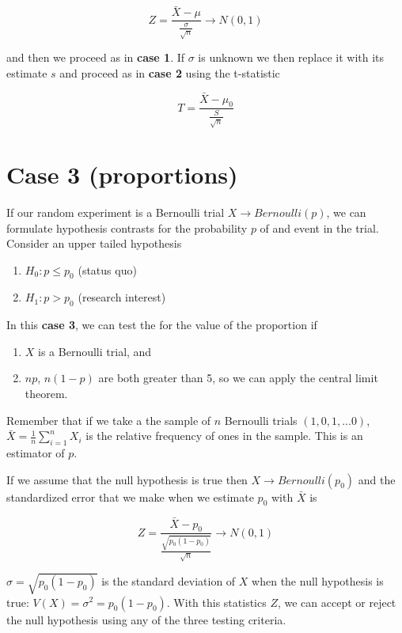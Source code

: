 \documentclass[
]{book}
\providecommand{\tightlist}{%
  \setlength{\itemsep}{0pt}\setlength{\parskip}{0pt}}
\begin{document}
\[Z=\frac{\bar{X}-\mu}{\frac{\sigma}{\sqrt{n}}}  \rightarrow N(0,1)\]

and then we proceed as in \textbf{case 1}. If \(\sigma\) is unknown we then replace it with its estimate \(s\) and proceed as in \textbf{case 2} using the t-statistic

\[T=\frac{\bar{X}-\mu_0}{\frac{S}{\sqrt{n}}}\]

\hypertarget{case-3-proportions-1}{%
\section{Case 3 (proportions)}\label{case-3-proportions-1}}

If our random experiment is a Bernoulli trial \(X \rightarrow Bernoulli(p)\), we can formulate hypothesis contrasts for the probability \(p\) of and event in the trial. Consider an upper tailed hypothesis

\begin{enumerate}
\def\labelenumi{\alph{enumi}.}
\tightlist
\item
  \(H_0: p \leq p_0\) (status quo)
\item
  \(H_1: p> p_0\) (research interest)
\end{enumerate}

In this \textbf{case 3}, we can test the for the value of the proportion if

\begin{enumerate}
\def\labelenumi{\arabic{enumi}.}
\tightlist
\item
  \(X\) is a Bernoulli trial, and
\item
  \(np\), \(n(1-p)\) are both greater than 5, so we can apply the central limit theorem.
\end{enumerate}

Remember that if we take a the sample of \(n\) Bernoulli trials \((1,0,1,...0)\), \(\bar{X}=\frac{1}{n}\sum_{i=1}^n X_i\) is the relative frequency of ones in the sample. This is an estimator of \(p\).

If we assume that the null hypothesis is true then \(X \rightarrow Bernoulli(p_0)\) and the standardized error that we make when we estimate \(p_0\) with \(\bar{X}\) is

\[Z=\frac{\bar{X}-p_0}{\frac{\sqrt{p_0(1-p_0)}}{\sqrt{n}}}  \rightarrow N(0,1)\]

\(\sigma=\sqrt{p_0(1-p_0)}\) is the standard deviation of \(X\) when the null hypothesis is true: \(V(X)=\sigma^2=p_0(1-p_0)\). With this statistics \(Z\), we can accept or reject the null hypothesis using any of the three testing criteria.
\end{document}
